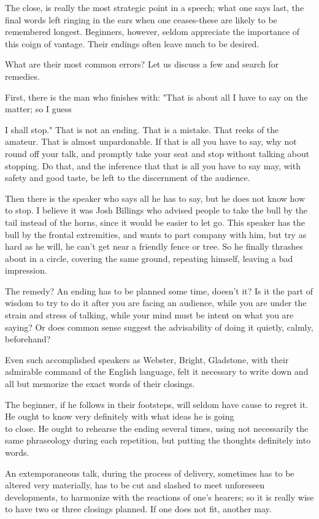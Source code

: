 \documentclass[10pt]{article}
\begin{document}
The close, is really the most strategic point in a speech; what one says last, the final words left ringing in the ears when one ceases-these are likely to be remembered longest. Beginners, however, seldom appreciate the importance of this coign of vantage. Their endings often leave much to be desired.

What are their most common errors? Let us discuss a few and search for remedies.

First, there is the man who finishes with: "That is about all I have to say on the matter; so I guess

I shall stop." That is not an ending. That is a mistake. That reeks of the amateur. That is almost unpardonable. If that is all you have to say, why not round off your talk, and promptly take your seat and stop without talking about stopping. Do that, and the inference that that is all you have to say may, with safety and good taste, be left to the discernment of the audience.

Then there is the speaker who says all he has to say, but he does not know how to stop. I believe it was Josh Billings who advised people to take the bull by the tail instead of the horns, since it would be easier to let go. This speaker has the bull by the frontal extremities, and wants to part company with him, but try as hard as he will, he can't get near a friendly fence or tree. So he finally thrashes about in a circle, covering the same ground, repeating himself, leaving a bad impression.

The remedy? An ending has to be planned some time, doesn't it? Is it the part of wisdom to try to do it after you are facing an audience, while you are under the strain and stress of talking, while your mind must be intent on what you are saying? Or does common sense suggest the advisability of doing it quietly, calmly, beforehand?

Even such accomplished speakers as Webster, Bright, Gladstone, with their admirable command of the English language, felt it necessary to write down and all but memorize the exact words of their closings.

The beginner, if he follows in their footsteps, will seldom have cause to regret it. He ought to know very definitely with what ideas he is going\\
to close. He ought to rehearse the ending several times, using not necessarily the same phraseology during each repetition, but putting the thoughts definitely into words.

An extemporaneous talk, during the process of delivery, sometimes has to be altered very materially, has to be cut and slashed to meet unforeseen developments, to harmonize with the reactions of one's hearers; so it is really wise to have two or three closings planned. If one does not fit, another may.
\end{document}
